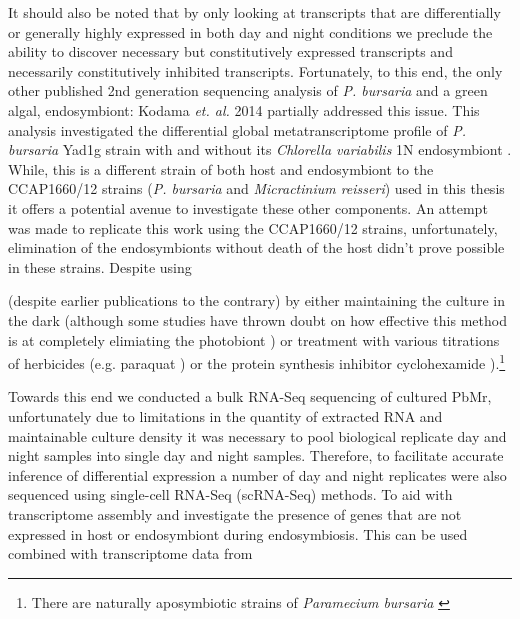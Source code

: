 It should also be noted that by only looking at transcripts that are differentially or generally highly expressed in both
day and night conditions we preclude the ability to discover necessary but constitutively expressed transcripts and necessarily
constitutively inhibited transcripts.  
Fortunately, to this end, the only other published 2nd generation sequencing analysis of \textit{P. bursaria} and a green algal,
endosymbiont: Kodama \textit{et. al.} 2014 \citep{Kodama2014} partially addressed this issue.  This analysis investigated 
the differential global metatranscriptome profile of \textit{P. bursaria} Yad1g strain with and without its \textit{Chlorella variabilis} 1N endosymbiont 
\citep{Kodama2014}.   While, this is a different strain of both host and endosymbiont to the CCAP1660/12 strains (\textit{P. bursaria} and \textit{Micractinium reisseri}) 
used in this thesis it offers a potential avenue to investigate these other components.
An attempt was made to replicate this work using the CCAP1660/12 strains, unfortunately, elimination of the endosymbionts without death of the host
didn't prove possible in these strains.  Despite using 

(despite earlier publications to the contrary) by either maintaining the culture in the dark \citep{Siegel1960} (although some studies have thrown doubt on
    how effective this method is at completely elimiating the photobiont \citep{Tanaka2002}) or treatment with various titrations of herbicides 
    (e.g. paraquat \citep{Hosoya1995a}) or the protein synthesis inhibitor cyclohexamide \citep{weis1984effect}).\footnote{
There are naturally aposymbiotic strains of \textit{Paramecium bursaria} \citep{Tonooka2002a}}













Towards this end we conducted a bulk RNA-Seq sequencing of cultured PbMr, unfortunately due to limitations in the quantity of
extracted RNA and maintainable culture density it was necessary to pool biological replicate day and night samples into single
day and night samples.  Therefore, to facilitate accurate inference of differential expression 
a number of day and night replicates were also sequenced using single-cell RNA-Seq (scRNA-Seq) methods.
To aid with transcriptome assembly and investigate the presence of genes that are not expressed in host
or endosymbiont during endosymbiosis.  This can be used combined with transcriptome data from 



